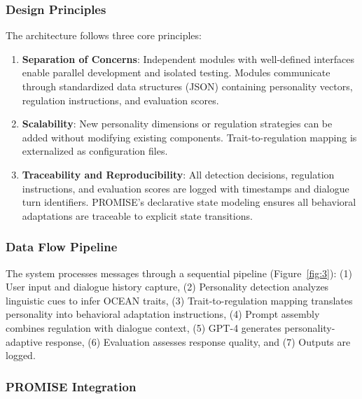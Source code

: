 

\subsubsection{Design Principles}\label{design-principles}

The architecture follows three core principles:

\begin{enumerate}
\def\labelenumi{(\roman{enumi})}
\item
  \textbf{Separation of Concerns}: Independent modules with well-defined interfaces enable parallel development and isolated testing. Modules communicate through standardized data structures (JSON) containing personality vectors, regulation instructions, and evaluation scores.
\item
  \textbf{Scalability}: New personality dimensions or regulation strategies can be added without modifying existing components. Trait-to-regulation mapping is externalized as configuration files.
\item
  \textbf{Traceability and Reproducibility}: All detection decisions, regulation instructions, and evaluation scores are logged with timestamps and dialogue turn identifiers. PROMISE's declarative state modeling ensures all behavioral adaptations are traceable to explicit state transitions.
\end{enumerate}

\subsubsection{Data Flow Pipeline}\label{data-flow-pipeline}

The system processes messages through a sequential pipeline (Figure~\ref{fig:3}): (1) User input and dialogue history capture, (2) Personality detection analyzes linguistic cues to infer OCEAN traits, (3) Trait-to-regulation mapping translates personality into behavioral adaptation instructions, (4) Prompt assembly combines regulation with dialogue context, (5) GPT-4 generates personality-adaptive response, (6) Evaluation assesses response quality, and (7) Outputs are logged.



\subsubsection{PROMISE Integration}\label{promise-integration}

